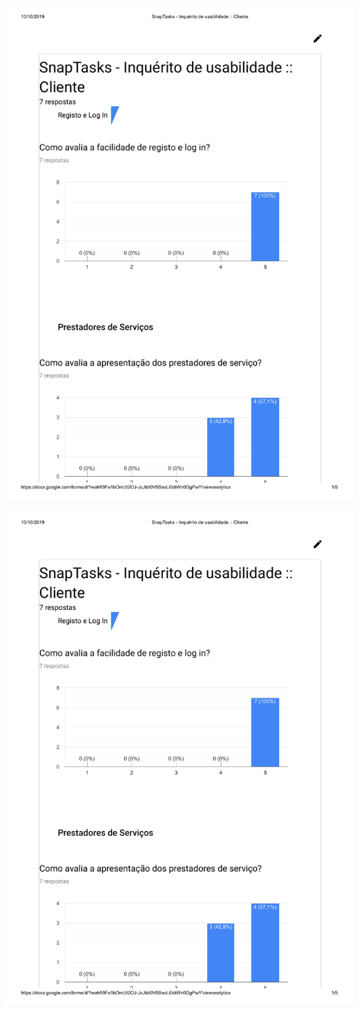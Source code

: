 \includegraphics[page=4,origin=c, width=\textwidth ]{appendices/files/InquiryCustomerAnswers.pdf}

\pagebreak

\includegraphics[page=5,origin=c, width=\textwidth ]{appendices/files/InquiryCustomerAnswers.pdf}
